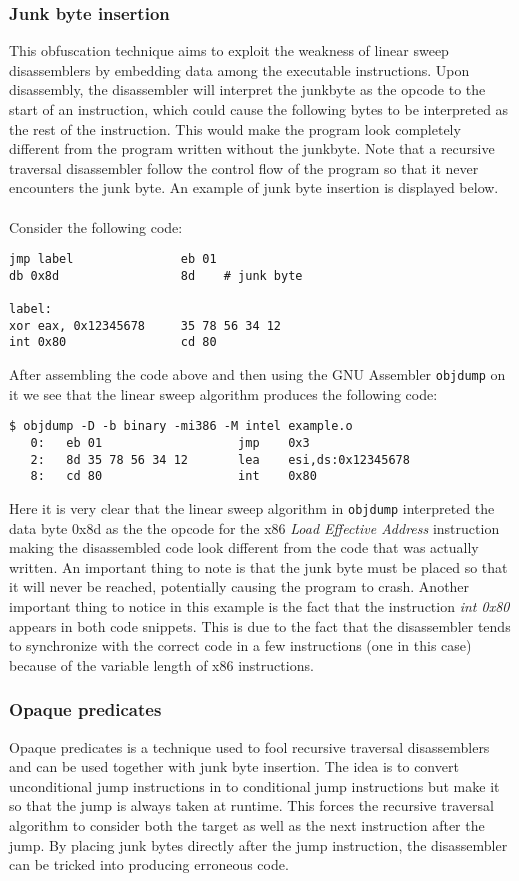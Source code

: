 \documentclass[11pt,twoside]{eitExjobb}
\begin{document}
\subsubsection{Junk byte insertion}
This obfuscation technique aims to exploit the weakness of linear sweep disassemblers by embedding data among the executable instructions. Upon disassembly, the disassembler will interpret the junkbyte as the opcode to the start of an instruction, which could cause the following bytes to be interpreted as the rest of the instruction. This would make the program look completely different from the program written without the junkbyte. Note that a recursive traversal disassembler follow the control flow of the program so that it never encounters the junk byte. An example of junk byte insertion is displayed below.\cite{instructionoverlapping}
\\
\\
Consider the following code:
\begin{verbatim}
jmp label               eb 01
db 0x8d                 8d    # junk byte

label:
xor eax, 0x12345678     35 78 56 34 12
int 0x80                cd 80
\end{verbatim}
\noindent After assembling the code above and then using the GNU Assembler \texttt{objdump}\cite{objdump} on it we see that the linear sweep algorithm produces the following code:

\begin{verbatim}
$ objdump -D -b binary -mi386 -M intel example.o
   0:	eb 01                	jmp    0x3
   2:	8d 35 78 56 34 12    	lea    esi,ds:0x12345678
   8:	cd 80                	int    0x80
\end{verbatim}

\noindent Here it is very clear that the linear sweep algorithm in \texttt{objdump} interpreted the data byte 0x8d as the the opcode for the x86 \emph{Load Effective Address} instruction making the disassembled code look different from the code that was actually written. An important thing to note is that the junk byte must be placed so that it will never be reached, potentially causing the program to crash. Another important thing to notice in this example is the fact that the instruction \emph{int 0x80} appears in both code snippets. This is due to the fact that the disassembler tends to synchronize with the correct code in a few instructions (one in this case) because of the variable length of x86 instructions.  

\subsubsection{Opaque predicates}
Opaque predicates is a technique used to fool recursive traversal disassemblers and can be used together with junk byte insertion. The idea is to convert unconditional jump instructions in to conditional jump instructions but make it so that the jump is always taken at runtime. This forces the recursive traversal algorithm to consider both the target as well as the next instruction after the jump. By placing junk bytes directly after the jump instruction, the disassembler can be tricked into producing erroneous code.\cite{instructionoverlapping}
\end{document}
